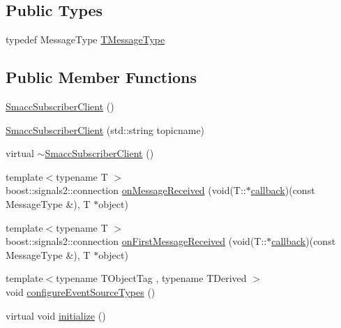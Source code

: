 \subsection*{Public Types}
\begin{DoxyCompactItemize}
\item 
typedef Message\+Type \hyperlink{classsmacc_1_1client__bases_1_1SmaccSubscriberClient_a61d798bda71bf335d72e61928ca561b0}{T\+Message\+Type}
\end{DoxyCompactItemize}
\subsection*{Public Member Functions}
\begin{DoxyCompactItemize}
\item 
\hyperlink{classsmacc_1_1client__bases_1_1SmaccSubscriberClient_a9c3dd9981beb495a0646667acae06d73}{Smacc\+Subscriber\+Client} ()
\item 
\hyperlink{classsmacc_1_1client__bases_1_1SmaccSubscriberClient_a7e739a204fe5fe5b8cd7542758555e45}{Smacc\+Subscriber\+Client} (std\+::string topicname)
\item 
virtual \hyperlink{classsmacc_1_1client__bases_1_1SmaccSubscriberClient_a91b9206c97b4acc76d4202639d24a53b}{$\sim$\+Smacc\+Subscriber\+Client} ()
\item 
{\footnotesize template$<$typename T $>$ }\\boost\+::signals2\+::connection \hyperlink{classsmacc_1_1client__bases_1_1SmaccSubscriberClient_a4f02251e3a161fb6d802b154b1081f18}{on\+Message\+Received} (void(T\+::$\ast$\hyperlink{3_2servers_2opencv__perception__node_2opencv__perception__node_8cpp_a050e697bd654facce10ea3f6549669b3}{callback})(const Message\+Type \&), T $\ast$object)
\item 
{\footnotesize template$<$typename T $>$ }\\boost\+::signals2\+::connection \hyperlink{classsmacc_1_1client__bases_1_1SmaccSubscriberClient_a3f6dc8ef86f21f401204182778cc584d}{on\+First\+Message\+Received} (void(T\+::$\ast$\hyperlink{3_2servers_2opencv__perception__node_2opencv__perception__node_8cpp_a050e697bd654facce10ea3f6549669b3}{callback})(const Message\+Type \&), T $\ast$object)
\item 
{\footnotesize template$<$typename T\+Object\+Tag , typename T\+Derived $>$ }\\void \hyperlink{classsmacc_1_1client__bases_1_1SmaccSubscriberClient_adf0e61d4a0b34ecc76fb9f4c3d04ef97}{configure\+Event\+Source\+Types} ()
\item 
virtual void \hyperlink{classsmacc_1_1client__bases_1_1SmaccSubscriberClient_af188f0f5e89de26a07e1f964cdd23a70}{initialize} ()
\end{DoxyCompactItemize}
